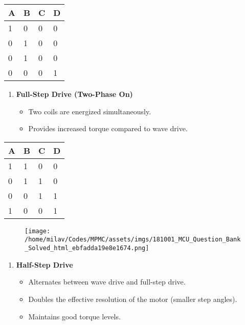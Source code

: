 \documentclass[
]{article}
\begin{document}
\begin{longtable}[]{@{}llll@{}}
\toprule
A & B & C & D \\
\midrule
\endhead
1 & 0 & 0 & 0 \\
0 & 1 & 0 & 0 \\
0 & 1 & 0 & 0 \\
0 & 0 & 0 & 1 \\
\bottomrule
\end{longtable}

\begin{enumerate}
\def\labelenumi{\arabic{enumi}.}
\item
  \textbf{Full-Step Drive (Two-Phase On)}

  \begin{itemize}
  \item
    Two coils are energized simultaneously.
  \item
    Provides increased torque compared to wave drive.
  \end{itemize}
\end{enumerate}

\begin{longtable}[]{@{}llll@{}}
\toprule
A & B & C & D \\
\midrule
\endhead
1 & 1 & 0 & 0 \\
0 & 1 & 1 & 0 \\
0 & 0 & 1 & 1 \\
1 & 0 & 0 & 1 \\
\bottomrule
\end{longtable}

\begin{figure}
\centering
\texttt{[image: /home/milav/Codes/MPMC/assets/imgs/181001\_MCU\_Question\_Bank\_Solved\_html\_ebfadda19e8e1674.png]}
\caption{}
\end{figure}

\begin{enumerate}
\def\labelenumi{\arabic{enumi}.}
\item
  \textbf{Half-Step Drive}

  \begin{itemize}
  \item
    Alternates between wave drive and full-step drive.
  \item
    Doubles the effective resolution of the motor (smaller step angles).
  \item
    Maintains good torque levels.
  \end{itemize}
\end{enumerate}
\end{document}
